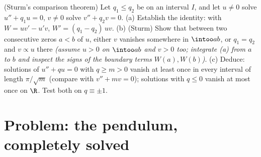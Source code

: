 \begin{exercise}[$\star\star\star$]\label{exo:b3:ode:12}
(Sturm's comparison theorem) Let $q_1 \leq q_2$ be
 on an interval $I$, and let $u \neq 0$ solve $u''
+ q_1u = 0$, $v \neq 0$ solve $v'' + q_2v = 0$.
(a) Establish the  identity: with $W = uv' - u'v$,
$W' = (q_1 - q_2)\,uv$.
(b) (Sturm) Show that between two consecutive zeros $a < b$
of $u$, either $v$ vanishes somewhere in $\intoo ab$, or
$q_1 = q_2$ and $v \propto u$ there \emph{(assume $u > 0$
on $\intoo ab$ and $v > 0$ too; integrate (a) from $a$ to
$b$ and inspect the signs of the boundary terms $W(a),
W(b)$)}.
(c) Deduce: solutions of $u'' + qu = 0$ with $q \geq m > 0$
vanish at least once in every interval of length
$\pi/\sqrt m$ (compare with $v'' + mv = 0$); solutions with
$q \leq 0$ vanish at most once on $\R$. Test both on
$q \equiv \pm1$.
\end{exercise}

\section{Problem: the pendulum, completely solved}

